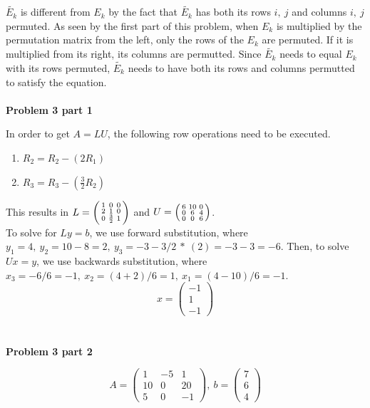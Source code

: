 \documentclass{report}
\begin{document}
$\tilde{E_k}$ is different from $E_k$ by the fact that $\tilde{E_k}$ has both its rows $i, \ j$ and columns $i, \ j$
permuted. As seen by the first part of this problem, when $E_k$ is multiplied by the permutation matrix from the 
left, only the rows of the $E_k$ are permuted. If it is multiplied from its right, its columns are permutted.
Since $\tilde{E_k}$ needs to equal $E_k$ with its rows permuted, $\tilde{E_k}$ needs to have both its rows and columns
permutted to satisfy the equation.\\\\

\noindent \textbf{Problem 3 part 1}

In order to get $A=LU$, the following row operations need to be executed.

\begin{enumerate}
    \item $R_2 = R_2 - (2R_1)$
    \item $R_3 = R_3 - (\frac{3}{2}R_2)$
\end{enumerate}

This results in $L = \begin{psmallmatrix} 1 & 0 & 0 \\ 2 & 1 & 0 \\ 0 & \frac{3}{2} & 1 \end{psmallmatrix}$
and $U= \begin{psmallmatrix} 6 & 10 & 0 \\ 0 & 6 & 4 \\ 0 & 0 & 6 \end{psmallmatrix}$. \\

To solve for $Ly=b$, we use forward substitution, where $y_1 = 4, \ y_2 = 10 - 8 = 2, \ y_3 = -3 -3/2 \ *\ (2) = -3 - 3 = -6$. Then, to solve
$Ux = y$, we use backwards substitution, where $x_3 = -6/6=-1, \  x_2 = (4+2)/6 = 1, \ x_1 = (4-10)/6 = -1$.\\ 

$$x = \begin{pmatrix} -1 \\ 1 \\ -1 \end{pmatrix}$$\\\\

\noindent \textbf{Problem 3 part 2}

$$ A = \begin{pmatrix} 1 & -5 & 1 \\ 10 & 0 & 20 \\ 5 & 0 & -1 \end{pmatrix}, \ b = \begin{pmatrix} 7 \\ 6 \\ 4 \end{pmatrix}$$
\end{document}
